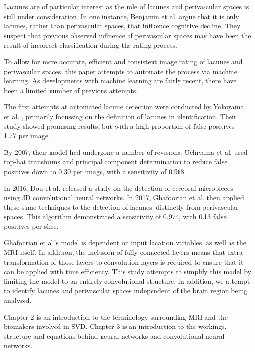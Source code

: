 Lacunes are of particular interest as the role of lacunes and perivascular spaces is still under consideration. In one instance, Benjamin et al. \cite{BenjaminJ.Philip2018LIbN} argue that it is only lacunes, rather than perivascular spaces, that influence cognitive decline. They suspect that previous observed influence of perivascular spaces may have been the result of incorrect classification during the rating process.

To allow for more accurate, efficient and consistent image rating of lacunes and perivascular spaces, this paper attempts to automate the process via machine learning. As developments with machine learning are fairly recent, there have been a limited number of previous attempts.

The first attempts at automated lacune detection were conducted by Yokoyama et al. \cite{YokoyamaRyujiro2002Aado}, primarily focussing on the definition of lacunes in identification. Their study showed promising results, but with a high proportion of false-positives - 1.77 per image.

By 2007, their model had undergone a number of revisions. Uchiyama et al. \cite{UchiyamaYoshikazu2007Ioad} used top-hat transforms and principal component determination to reduce false positives down to 0.30 per image, with a sensitivity of 0.968.

In 2016, Dou et al. \cite{DouQ.2016ADoC} released a study on the detection of cerebral microbleeds using 3D convolutional neural networks. In 2017, Ghafoorian et al. \cite{GhafoorianM.2017Dml3} then applied these same techniques to the detection of lacunes, distinctly from perivascular spaces. This algorithm demonstrated a sensitivity of 0.974, with 0.13 false positives per slice.

Ghafoorian et al.'s model is dependent on input location variables, as well as the MRI itself. In addition, the inclusion of fully connected layers means that extra transformation of those layers to convolution layers is required to ensure that it can be applied with time efficiency. This study attempts to simplify this model by limiting the model to an entirely convolutional structure. In addition, we attempt to identify lacunes and perivascular spaces independent of the brain region being analysed.

Chapter 2 is an introduction to the terminology surrounding MRI and the biomakers involved in SVD. Chapter 3 is an introduction to the workings, structure and equations behind neural networks and convolutional neural networks.

